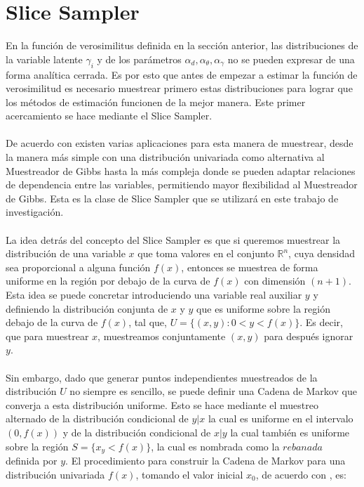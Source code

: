 \section{Slice Sampler}
En la funci\'on de verosimilitus definida en la secci\'on anterior, las distribuciones de la variable latente $\gamma_i$ y de los par\'ametros $\alpha_d,\alpha_\theta,\alpha_\gamma$ no se pueden expresar de una forma anal\'itica cerrada. Es por esto que antes de empezar a estimar la funci\'on de verosimilitud es necesario muestrear primero estas distribuciones para lograr que los m\'etodos de estimaci\'on funcionen de la mejor manera. Este primer acercamiento se hace mediante el Slice Sampler.\\
\\
De acuerdo con \cite{neal2003slice} existen varias aplicaciones para esta manera de muestrear, desde la manera m\'as simple con una distribuci\'on univariada como alternativa al Muestreador de Gibbs hasta la m\'as compleja donde se pueden adaptar relaciones de dependencia entre las variables, permitiendo mayor flexibilidad al Muestreador de Gibbs. Esta es la clase de Slice Sampler que se utilizar\'a en este trabajo de investigaci\'on.\\
\\
La idea detr\'as del concepto del Slice Sampler es que si queremos muestrear la distribuci\'on de una variable $x$ que toma valores en el conjunto $\mathbb{R}^n$, cuya densidad sea proporcional a alguna funci\'on $f(x)$, entonces se muestrea de forma uniforme en la regi\'on por debajo de la curva de $f(x)$ con dimensi\'on $(n+1)$. Esta idea se puede concretar introduciendo una variable real auxiliar $y$ y definiendo la distribuci\'on conjunta de $x$ y $y$ que es uniforme sobre la regi\'on debajo de la curva de $f(x)$, tal que, $U=\{(x,y):0<y<f(x)\}$. Es decir, que para muestrear $x$, muestreamos conjuntamente $(x,y)$ para despu\'es ignorar $y$.\\
\\
Sin embargo, dado que generar puntos independientes muestreados de la distribuci\'on $U$ no siempre es sencillo, se puede definir una Cadena de Markov que converja a esta distribuci\'on uniforme. Esto se hace mediante el muestreo alternado de la distribuci\'on condicional de $y|x$ la cual es uniforme en el intervalo $(0,f(x))$ y de la distribuci\'on condicional de $x|y$ la cual tambi\'en es uniforme sobre la regi\'on $S=\{x_y<f(x)\}$, la cual es nombrada como la $rebanada$ definida por $y$. El procedimiento para construir la Cadena de Markov para una distribuci\'on univariada $f(x)$, tomando el valor inicial $x_0$, de acuerdo con \cite{neal2003slice}, es:
